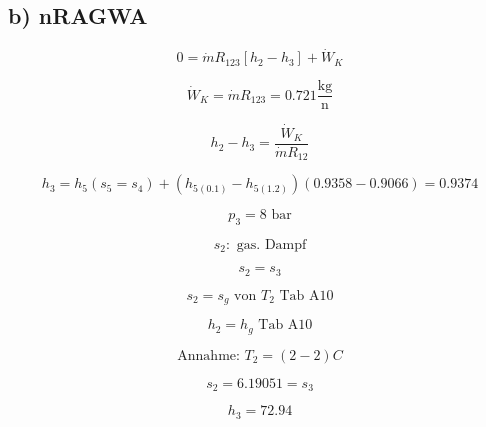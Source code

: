 \subsection*{b) nRAGWA}

\[
0 = \dot{m} R_{123} \left[ h_2 - h_3 \right] + \dot{W}_K
\]

\[
\dot{W}_K = \dot{m} R_{123} = 0.721 \frac{\text{kg}}{\text{n}}
\]

\[
h_2 - h_3 = \frac{\dot{W}_K}{\dot{m} R_{12}}
\]

\[
h_3 = h_5 (s_5 = s_4) + \left( h_{5(0.1)} - h_{5(1.2)} \right) \left( 0.9358 - 0.9066 \right) = 0.9374
\]

\[
p_3 = 8 \text{ bar}
\]

\[
s_2: \text{ gas. Dampf}
\]

\[
s_2 = s_3
\]

\[
s_2 = s_g \text{ von } T_2 \text{ Tab A10}
\]

\[
h_2 = h_g \text{ Tab A10}
\]

\[
\text{Annahme: } T_2 = (2-2) C
\]

\[
s_2 = 6.19051 = s_3
\]

\[
h_3 = 72.94
\]